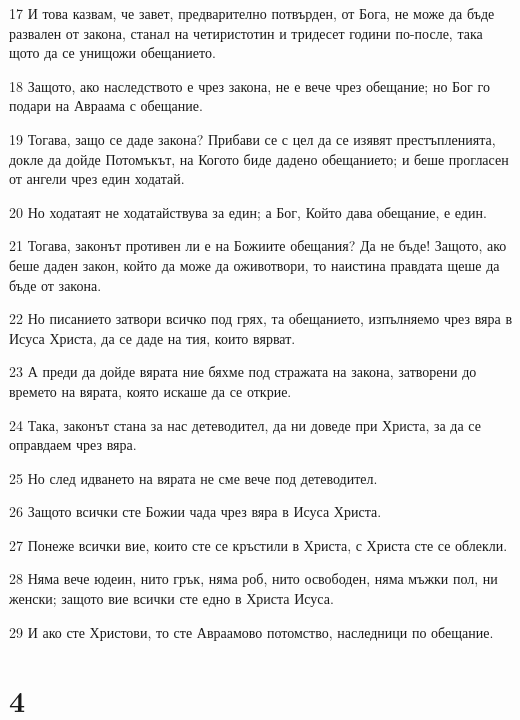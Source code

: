 \par 17 И това казвам, че завет, предварително потвърден, от Бога, не може да бъде развален от закона, станал на четиристотин и тридесет години по-после, така щото да се унищожи обещанието.
\par 18 Защото, ако наследството е чрез закона, не е вече чрез обещание; но Бог го подари на Авраама с обещание.
\par 19 Тогава, защо се даде закона? Прибави се с цел да се изявят престъпленията, докле да дойде Потомъкът, на Когото биде дадено обещанието; и беше прогласен от ангели чрез един ходатай.
\par 20 Но ходатаят не ходатайствува за един; а Бог, Който дава обещание, е един.
\par 21 Тогава, законът противен ли е на Божиите обещания? Да не бъде! Защото, ако беше даден закон, който да може да оживотвори, то наистина правдата щеше да бъде от закона.
\par 22 Но писанието затвори всичко под грях, та обещанието, изпълняемо чрез вяра в Исуса Христа, да се даде на тия, които вярват.
\par 23 А преди да дойде вярата ние бяхме под стражата на закона, затворени до времето на вярата, която искаше да се открие.
\par 24 Така, законът стана за нас детеводител, да ни доведе при Христа, за да се оправдаем чрез вяра.
\par 25 Но след идването на вярата не сме вече под детеводител.
\par 26 Защото всички сте Божии чада чрез вяра в Исуса Христа.
\par 27 Понеже всички вие, които сте се кръстили в Христа, с Христа сте се облекли.
\par 28 Няма вече юдеин, нито грък, няма роб, нито освободен, няма мъжки пол, ни женски; защото вие всички сте едно в Христа Исуса.
\par 29 И ако сте Христови, то сте Авраамово потомство, наследници по обещание.

\chapter{4}

